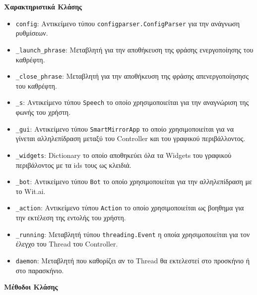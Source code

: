 \noindent\textbf{Χαρακτηριστικά Κλάσης}
\begin{itemize}
    \item \texttt{config}: Αντικείμενο τύπου \texttt{configparser.ConfigParser} για την ανάγνωση ρυθμίσεων.
    \item \texttt{\_launch\_phrase}: Μεταβλητή για την αποθήκευση της φράσης ενεργοποίησης του καθρέφτη.
    \item \texttt{\_close\_phrase}: Μεταβλητή για την αποθήκευση της φράσης απενεργοποίησησς του καθρέφτη.
    \item \texttt{\_s}: Αντικείμενο τύπου \texttt{Speech} το οποίο χρησιμοποιείται για την αναγνώριση της φωνής του χρήστη.
    \item \texttt{\_gui}: Αντικείμενο τύπου \texttt{SmartMirrorApp} το οποίο χρησιμοποιείται για να γίνεται αλληλεπίδραση μεταξύ του Controller και του γραφικού περιβάλλοντος.
    \item \texttt{\_widgets}: Dictionary το οποίο αποθηκεύει όλα τα Widgets του γραφικού περιβάλοντος με τα ids τους ως κλειδιά.
    \item \texttt{\_bot}: Αντικείμενο τύπου \texttt{Bot} το οποίο χρησιμοποιείται για την αλληλεπίδραση με το Wit.ai.
    \item \texttt{\_action}: Αντικείμενο τύπου \texttt{Action} το οποίο χρησιμοποιείται ως βοηθημα για την εκτέλεση της εντολής του χρήστη.
    \item \texttt{\_running}: Μεταβλητή τύπου \texttt{threading.Event} η οποία χρησιμοποιείται για τον έλεγχο του Thread του Controller.
    \item \texttt{daemon}: Μεταβλητή που καθορίζει αν το Thread θα εκτελεστεί στο προσκήνιο ή στο παρασκήνιο.
\end{itemize}
\noindent\textbf{Μέθοδοι Κλάσης}
